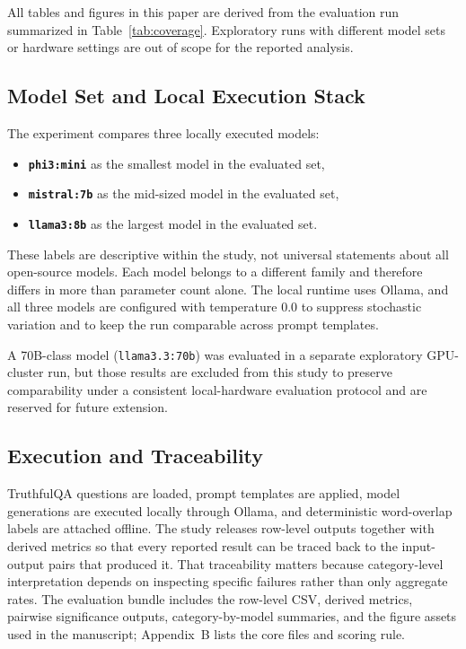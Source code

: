 \documentclass[conference]{IEEEtran}
\begin{document}
All tables and figures in this paper are derived from the evaluation run summarized in Table~\ref{tab:coverage}. Exploratory runs with different model sets or hardware settings are out of scope for the reported analysis.

\subsection{\textbf{Model Set and Local Execution Stack}}

The experiment compares three locally executed models:

\begin{itemize}
    \item \textbf{\texttt{phi3:mini}} as the smallest model in the evaluated set,
    \item \textbf{\texttt{mistral:7b}} as the mid-sized model in the evaluated set,
    \item \textbf{\texttt{llama3:8b}} as the largest model in the evaluated set.
\end{itemize}

These labels are descriptive within the study, not universal statements about all open-source models. Each model belongs to a different family and therefore differs in more than parameter count alone. The local runtime uses Ollama, and all three models are configured with temperature $0.0$ to suppress stochastic variation and to keep the run comparable across prompt templates.

A 70B-class model (\texttt{llama3.3:70b}) was evaluated in a separate exploratory GPU-cluster run, but those results are excluded from this study to preserve comparability under a consistent local-hardware evaluation protocol and are reserved for future extension.

\subsection{\textbf{Execution and Traceability}}

TruthfulQA questions are loaded, prompt templates are applied, model generations are executed locally through Ollama, and deterministic word-overlap labels are attached offline. The study releases row-level outputs together with derived metrics so that every reported result can be traced back to the input-output pairs that produced it. That traceability matters because category-level interpretation depends on inspecting specific failures rather than only aggregate rates. The evaluation bundle includes the row-level CSV, derived metrics, pairwise significance outputs, category-by-model summaries, and the figure assets used in the manuscript; Appendix~B lists the core files and scoring rule.
\end{document}
